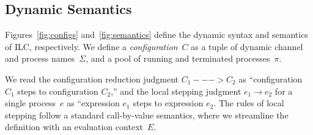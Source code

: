 \begin{comment}
The fork rule says that that if we can appropriately split the affine context
such that the child process $e_1$ has type $A$ and mode $m_1$ and the
``continue'' process $e_2$ has type $B$ and mode $m_2$, then the whole
expression has type $B$ and mode $m_3$, which is derived by composing $m_1$ and
$m_2$ in parallel. Again, we emphasize that composing two write mode processes
in parallel violates type checking, i.e., $\Wm ;; \Wm => p$ cannot be derived
for any mode $p$.

Finally, the choice rule says that if we can appropriately split the affine
context such that both subexpressions $A$ and mode $R$, then the whole
expression follows exactly.

\paragraph{Affine rules.} The affine typing rules are, for the most part, analagous to their
intuitionistic counterparts. Two differences bear mentioning. First, the bang!
rule only lifts intuitionistically typed expressions that are closed with
respect to affine variables into an affinely typed expression. Otherwise, one
could wrap an intuitionistically typed expression with free affine variables in
a bang! and use it in an unrestricted manner. Second, in contrast with the abs
rule, the lollipop rule does not require function bodies to be free with respect
to affine variables.
\end{comment}

\subsection{Dynamic Semantics}
\label{subsec:semantics}

Figures~\ref{fig:configs} and~\ref{fig:semantics} define the dynamic syntax and
semantics of ILC, respectively.
%
We define a \emph{configuration}~$C$ as a tuple of dynamic channel and process names~$\Sigma$, 
and a pool of running and terminated processes~$\pi$.

We read the configuration reduction judgment $C_1 ---> C_2$ as ``configuration
$C_1$ steps to configuration $C_2$,'' 
%
and the local stepping judgment $e_1 \longrightarrow e_2$ for a single process~$e$ as
``expression $e_1$ steps to expression $e_2$.
%
The rules of local stepping follow a standard call-by-value semantics, 
where we streamline the definition with an evaluation context~$E$.

